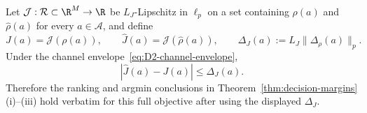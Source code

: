 \begin{corollary}
\label{cor:lipschitz-full-objective-margins}
Let $\mathcal J:\mathcal R\subset\R^M\to\R$ be $L_J$-Lipschitz in
$\ell_p$ on a set containing $\rho(a)$ and $\hat\rho(a)$ for every
$a\in\mathcal A$, and define
\[
  J(a)=\mathcal J(\rho(a)),
  \qquad
  \hat J(a)=\mathcal J(\hat\rho(a)),
  \qquad
  \Delta_J(a):=L_J\|\Delta_\rho(a)\|_p.
\]
Under the channel envelope~\eqref{eq:D2-channel-envelope},
\begin{equation}
  |\hat J(a)-J(a)|\leq\Delta_J(a).
  \label{eq:D2-lipschitz-objective-envelope}
\end{equation}
Therefore the ranking and argmin conclusions in
Theorem~\ref{thm:decision-margins}(i)--(iii) hold verbatim for this full
objective after using the displayed $\Delta_J$.


\end{corollary}
